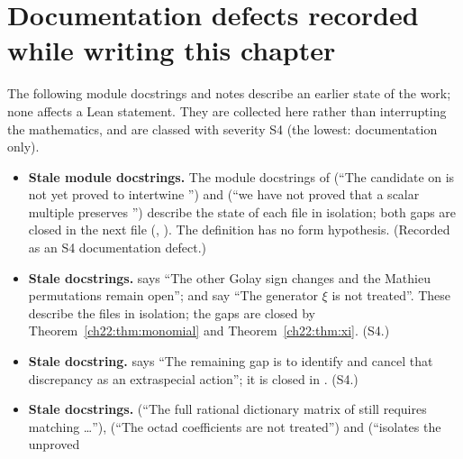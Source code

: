 \section{Documentation defects recorded while writing this chapter}\label{ch22:sec:docdefects}

The following module docstrings and notes describe an earlier state of the work; none affects a Lean statement.  They
are collected here rather than interrupting the mathematics, and are classed with severity S4 (the lowest: documentation only).
\begin{warning}
\begin{itemize}
\item \textbf{Stale module docstrings.}  The module docstrings of  (``The
candidate on  is not yet proved to intertwine '') and
 (``we have not proved that a scalar multiple preserves
'') describe the state of each file in isolation; both gaps are closed in the next file
(, ).  The definition  has no form
hypothesis.  (Recorded as an S4 documentation defect.)
\item \textbf{Stale docstrings.}   says ``The other Golay sign changes
and the Mathieu permutations remain open'';  and
 say ``The generator $\xi$ is not treated''.  These describe the
files in isolation; the gaps are closed by Theorem~\ref{ch22:thm:monomial} and Theorem~\ref{ch22:thm:xi}.  (S4.)
\item \textbf{Stale docstring.}   says ``The remaining gap is to identify
and cancel that discrepancy as an extraspecial action''; it is closed in
.  (S4.)
\item \textbf{Stale docstrings.}   (``The full rational dictionary matrix of
 still requires matching \dots''),  (``The octad
 coefficients are not treated'') and  (``isolates the unproved

\end{itemize}
\end{warning}
